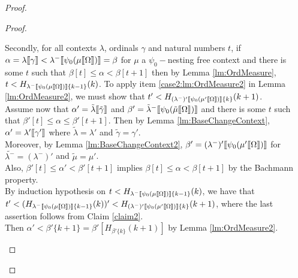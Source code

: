 \documentclass{amsart}
\theoremstyle{plain}
\theoremstyle{plain}
\def\scbrl{[\hspace{-.14em}[}
\def\scbrr{]\hspace{-.14em}]}
\def\scbr#1{\scbrl#1\scbrr}
\newcommand{\Om}{{\Omega}}
\newcommand{\al}{{\alpha}}
\newcommand{\be}{{\beta}}
\newcommand{\ga}{\gamma}
\newcommand{\la}{\lambda}
\def\scbrl{[\hspace{-.14em}[}
\def\scbrr{]\hspace{-.14em}]}
\def\scbr#1{\scbrl#1\scbrr}
\begin{document}
\begin{proof}
\begin{proof}
\begin{Cases}
    \item  
    Secondly, for all contexts $\la$, ordinals $\ga$ and natural numbers $t$, 
    if $\al=\la\scbr{\ga}< \la^-\scbr{\psi_0(\mu\scbr{\Om})}=\be $ for $\mu$ a $\psi_0-$nesting free context and there is some $t$ such that $\be[t]\leq \al <\be[t+1]$ then by Lemma \ref{lm:OrdMeasure}, $t<H_{\la^-\scbr{\psi_0(\mu\scbr{\Om})}\{k-1\}}(k)$. To apply item \ref{case2:lm:OrdMeasure2} in Lemma \ref{lm:OrdMeasure2}, we must show that $t'<H_{(\la^-)'\scbr{\psi_0(\mu'\scbr{\Om})}\{k\}}(k+1)$.
    \medskip\\
    Assume now  that $\al'=\tilde{\la}\scbr{\tilde{\ga}}$ and $\be'=\tilde{\la}^-\scbr{\psi_0(\tilde{\mu}\scbr{\Om})}$ and there is some $t$ such that $\be'[t] \leq\al\leq\be'[t+1]$.
    Then by Lemma \ref{lm:BaseChangeContext}, $\al' = \la'\scbr{\ga'}$ where $\tilde{\la}=\la'$ and $\tilde{\ga}=\ga'$. 
    \smallskip\\
    Moreover, by Lemma \ref{lm:BaseChangeContext2}, $\be' = (\la^-)'\scbr{\psi_0(\mu'\scbr{\Om})}$ for $\tilde{\la^-} = (\la^-)'$ and $\tilde{\mu}=\mu'$.
    \smallskip\\
    Also, $\be'[t]\leq \al' <\be'[t+1]$ implies $\be[t] \leq \al<\be[t+1]$ by the Bachmann property.\smallskip
    \\
    By induction hypothesis on  $t<H_{\la^-\scbr{\psi_0(\mu\scbr{\Om})}\{k-1\}}(k)$, we have that
    \medskip\\
    $t' < (H_{\la^-\scbr{\psi_0(\mu\scbr{\Om})}\{k-1\}}(k))'< H_{(\la^-)'\scbr{\psi_0(\mu'\scbr{\Om})}\{k\}}(k+1)$, where the last assertion follows from Claim \ref{claim2}.
    \smallskip
\\
    Then $\al' < \be'\{k+1\}= \be'[H_{\be'\{k\}}(k+1)]$ by Lemma \ref{lm:OrdMeasure2}.
    \\
    

\end{Cases}
\end{proof}
\end{proof}
\end{document}
